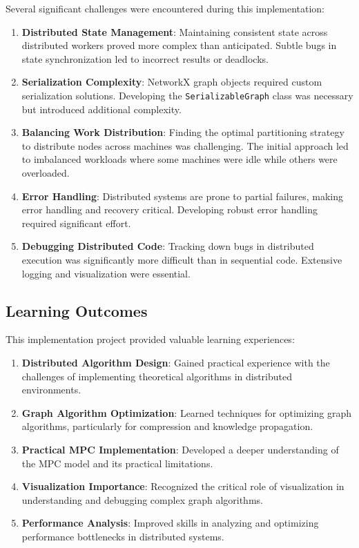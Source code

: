 \documentclass[11pt,a4paper]{article}
\begin{document}
Several significant challenges were encountered during this implementation:

\begin{enumerate}
    \item \textbf{Distributed State Management}: Maintaining consistent state across distributed workers proved more complex than anticipated. Subtle bugs in state synchronization led to incorrect results or deadlocks.

    \item \textbf{Serialization Complexity}: NetworkX graph objects required custom serialization solutions. Developing the \texttt{SerializableGraph} class was necessary but introduced additional complexity.

    \item \textbf{Balancing Work Distribution}: Finding the optimal partitioning strategy to distribute nodes across machines was challenging. The initial approach led to imbalanced workloads where some machines were idle while others were overloaded.

    \item \textbf{Error Handling}: Distributed systems are prone to partial failures, making error handling and recovery critical. Developing robust error handling required significant effort.

    \item \textbf{Debugging Distributed Code}: Tracking down bugs in distributed execution was significantly more difficult than in sequential code. Extensive logging and visualization were essential.
\end{enumerate}

\subsection{Learning Outcomes}

This implementation project provided valuable learning experiences:

\begin{enumerate}
    \item \textbf{Distributed Algorithm Design}: Gained practical experience with the challenges of implementing theoretical algorithms in distributed environments.

    \item \textbf{Graph Algorithm Optimization}: Learned techniques for optimizing graph algorithms, particularly for compression and knowledge propagation.

    \item \textbf{Practical MPC Implementation}: Developed a deeper understanding of the MPC model and its practical limitations.

    \item \textbf{Visualization Importance}: Recognized the critical role of visualization in understanding and debugging complex graph algorithms.

    \item \textbf{Performance Analysis}: Improved skills in analyzing and optimizing performance bottlenecks in distributed systems.
\end{enumerate}
\end{document}
